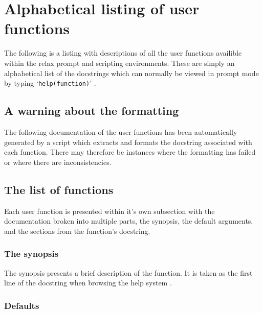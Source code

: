 
\chapter{Alphabetical listing of user functions}

The following is a listing with descriptions of all the user functions  availible within the relax prompt and scripting environments.  These are simply an alphabetical list of the docstrings which can normally be viewed in prompt mode by typing `\texttt{help(function)}' .





\section{A warning about the formatting}

The following documentation of the user functions  has been automatically generated by a script which extracts and formats the docstring associated with each function.  There may therefore be instances where the formatting has failed or where there are inconsistencies.




\section{The list of functions}

Each user function  is presented within it's own subsection with the documentation broken into multiple parts, the synopsis, the default arguments, and the sections from the function's docstring.


\subsection{The synopsis}

The synopsis presents a brief description of the function.  It is taken as the first line of the docstring when browsing the help system .


\subsection{Defaults}

